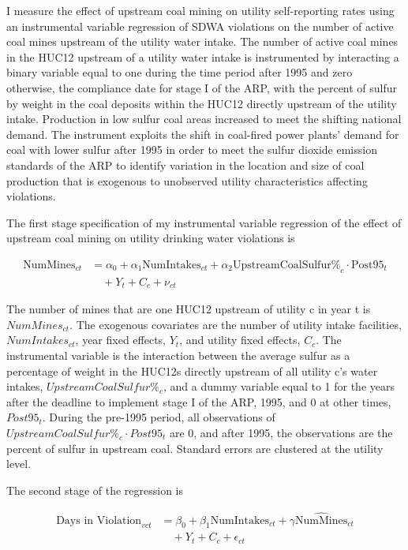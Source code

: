 \documentclass[12pt]{article}
\begin{document}
I measure the effect of upstream coal mining on utility self-reporting rates using an instrumental variable regression of SDWA violations on the number of active coal mines upstream of the utility water intake. The number of active coal mines in the HUC12 upstream of a utility water intake is instrumented by interacting a binary variable equal to one during the time period after 1995 and zero otherwise, the compliance date for stage I of the ARP, with the percent of sulfur by weight in the coal deposits within the HUC12 directly upstream of the utility intake. Production in low sulfur coal areas increased to meet the shifting national demand. The instrument exploits the shift in coal-fired power plants' demand for coal with lower sulfur after 1995 in order to meet the sulfur dioxide emission standards of the ARP to identify variation in the location and size of coal production that is exogenous to unobserved utility characteristics affecting violations.

The first stage specification of my instrumental variable regression of the effect of upstream coal mining on utility drinking water violations is

\begin{equation}\label{1ststage2sls}
\begin{split}
\text{NumMines}_{ct} &= \alpha_0 + \alpha_1\text{NumIntakes}_{ct} + \alpha_2\text{UpstreamCoalSulfur\%}_c \cdot \text{Post95}_t \\
&\quad + Y_t + C_c + \nu_{ct}
\end{split}
\end{equation}

The number of mines that are one HUC12 upstream of utility c in year t is $NumMines_{ct}$. The exogenous covariates are the number of utility intake facilities, $NumIntakes_{ct}$, year fixed effects, $Y_t$, and utility fixed effects, $C_c$. The instrumental variable is the interaction between the average sulfur as a percentage of weight in the HUC12s directly upstream of all utility c's water intakes, $UpstreamCoalSulfur\%_c$, and a dummy variable equal to 1 for the years after the deadline to implement stage I of the ARP, 1995, and 0 at other times, $Post95_t$. During the pre-1995 period, all observations of $UpstreamCoalSulfur\%_c \cdot Post95_t$ are 0, and after 1995, the observations are the percent of sulfur in upstream coal. Standard errors are clustered at the utility level. 

The second stage of the regression is

\begin{equation}\label{2ndstage2sls}
\begin{split}
\text{Days in Violation}_{vct} &= \beta_0 + \beta_1\text{NumIntakes}_{ct} + \gamma\widehat{\text{NumMines}}_{ct} \\
&\quad + Y_t + C_c + \epsilon_{ct}
\end{split}
\end{equation}
\end{document}
